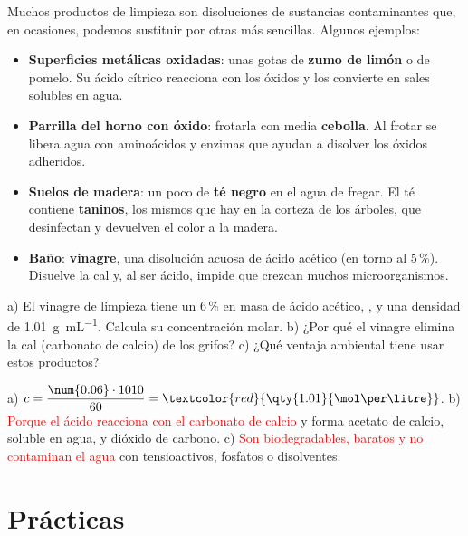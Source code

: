 Muchos productos de limpieza son disoluciones de sustancias contaminantes que, en ocasiones, podemos sustituir por otras más
sencillas. Algunos ejemplos:

\begin{itemize}
    \item \textbf{Superficies metálicas oxidadas}: unas gotas de \textbf{zumo de limón} o de pomelo. Su ácido cítrico reacciona con
    los óxidos y los convierte en sales solubles en agua.
    \item \textbf{Parrilla del horno con óxido}: frotarla con media \textbf{cebolla}. Al frotar se libera agua con aminoácidos y
    enzimas que ayudan a disolver los óxidos adheridos.
    \item \textbf{Suelos de madera}: un poco de \textbf{té negro} en el agua de fregar. El té contiene \textbf{taninos}, los mismos
    que hay en la corteza de los árboles, que desinfectan y devuelven el color a la madera.
    \item \textbf{Baño}: \textbf{vinagre}, una disolución acuosa de ácido acético (en torno al 5\,\%). Disuelve la cal y, al ser
    ácido, impide que crezcan muchos microorganismos.
\end{itemize}

\begin{exercise}
    a) El vinagre de limpieza tiene un 6\,\% en masa de ácido acético, , y una densidad de \qty{1.01}{\gram\per\mL}.
    Calcula su concentración molar. b) ¿Por qué el vinagre elimina la cal (carbonato de calcio) de los grifos? c) ¿Qué ventaja
    ambiental tiene usar estos productos?
    \begin{solu}
        a) \(c = \dfrac{\num{0.06} \cdot 1010}{60} = \textcolor{red}{\qty{1.01}{\mol\per\litre}}\). b) \textcolor{red}{Porque el
        ácido reacciona con el carbonato de calcio} y forma acetato de calcio, soluble en agua, y dióxido de carbono.
        c) \textcolor{red}{Son biodegradables, baratos y no contaminan el agua} con tensioactivos, fosfatos o disolventes.
    \end{solu}
\end{exercise}

\section{Prácticas}\label{sec:ud2-practicas}

